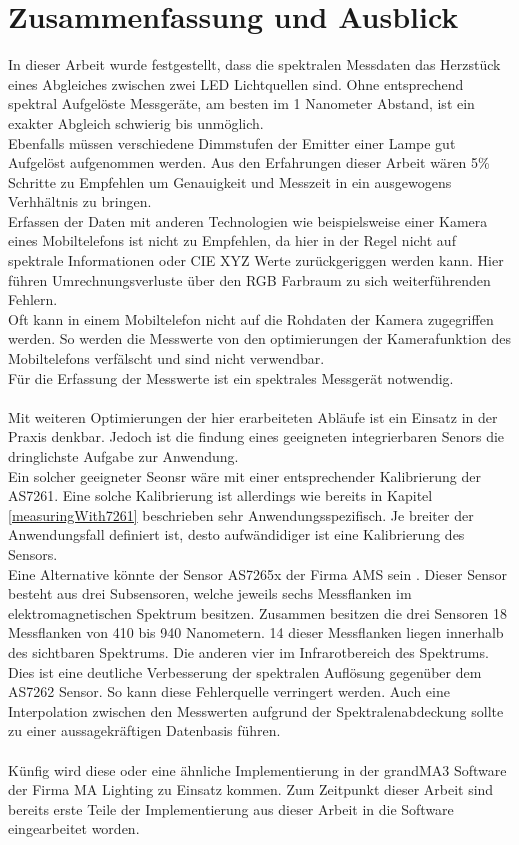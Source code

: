 \documentclass[11pt]{scrartcl}
\begin{document}
\section{Zusammenfassung und Ausblick}
In dieser Arbeit wurde festgestellt, dass die spektralen Messdaten das Herzstück eines Abgleiches zwischen
zwei LED Lichtquellen sind. Ohne entsprechend spektral Aufgelöste Messgeräte, am besten im 1 Nanometer Abstand,
ist ein exakter Abgleich schwierig bis unmöglich.\\
Ebenfalls müssen verschiedene Dimmstufen der Emitter einer Lampe gut Aufgelöst aufgenommen werden. Aus den
Erfahrungen dieser Arbeit wären 5\% Schritte zu Empfehlen um Genauigkeit und Messzeit in ein ausgewogens
Verhhältnis zu bringen.\\
Erfassen der Daten mit anderen Technologien wie beispielsweise einer Kamera eines Mobiltelefons ist nicht zu
Empfehlen, da hier in der Regel nicht auf spektrale Informationen oder CIE XYZ Werte zurückgeriggen werden kann.
Hier führen Umrechnungsverluste über den RGB Farbraum zu sich weiterführenden Fehlern.\\
Oft kann in einem Mobiltelefon nicht auf die Rohdaten der Kamera zugegriffen werden. So werden die Messwerte von
den optimierungen der Kamerafunktion des Mobiltelefons verfälscht und sind nicht verwendbar.\\
Für die Erfassung der Messwerte ist ein spektrales Messgerät notwendig.\\
\\
Mit weiteren Optimierungen der hier erarbeiteten Abläufe ist ein Einsatz in der Praxis denkbar. Jedoch ist die
findung eines geeigneten integrierbaren Senors die dringlichste Aufgabe zur Anwendung.\\
Ein solcher geeigneter Seonsr wäre mit einer entsprechender Kalibrierung der AS7261. Eine solche Kalibrierung ist
allerdings wie bereits in Kapitel \ref{measuringWith7261} beschrieben sehr Anwendungsspezifisch. Je breiter der
Anwendungsfall definiert ist, desto aufwändidiger ist eine Kalibrierung des Sensors.\\
Eine Alternative könnte der Sensor AS7265x der Firma AMS sein \cite{datasheet65}. Dieser Sensor besteht aus drei
Subsensoren, welche jeweils sechs Messflanken im elektromagnetischen Spektrum besitzen. Zusammen besitzen die drei
Sensoren 18 Messflanken von 410 bis 940 Nanometern. 14 dieser Messflanken liegen innerhalb des sichtbaren Spektrums.
Die anderen vier im Infrarotbereich des Spektrums.\\
Dies ist eine deutliche Verbesserung der spektralen Auflösung gegenüber dem AS7262 Sensor. So kann diese Fehlerquelle
verringert werden. Auch eine Interpolation zwischen den Messwerten aufgrund der Spektralenabdeckung sollte zu einer
aussagekräftigen Datenbasis führen.\\
\\
Künfig wird diese oder eine ähnliche Implementierung in der grandMA3 Software der Firma MA Lighting zu Einsatz kommen.
Zum Zeitpunkt dieser Arbeit sind bereits erste Teile der Implementierung aus dieser Arbeit in die Software
eingearbeitet worden.
\clearpage
\end{document}
